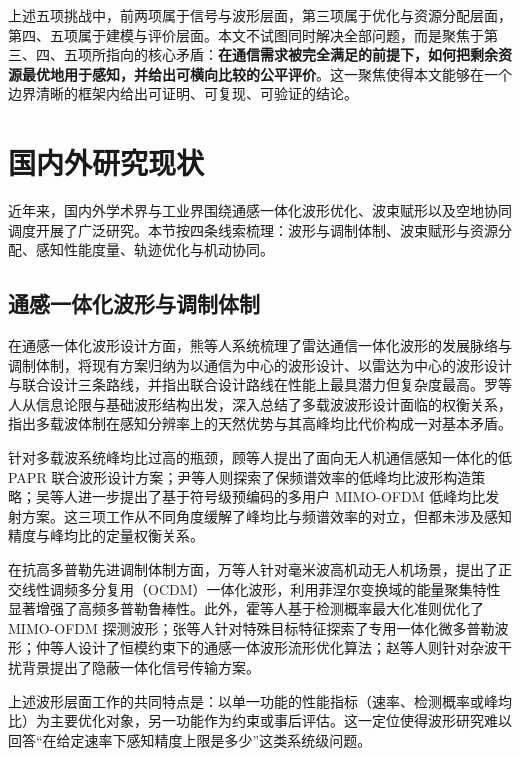 上述五项挑战中，前两项属于信号与波形层面，第三项属于优化与资源分配层面，第四、五项属于建模与评价层面。本文不试图同时解决全部问题，而是聚焦于第三、四、五项所指向的核心矛盾：\textbf{在通信需求被完全满足的前提下，如何把剩余资源最优地用于感知，并给出可横向比较的公平评价}。这一聚焦使得本文能够在一个边界清晰的框架内给出可证明、可复现、可验证的结论。

\section{国内外研究现状}
\label{sec:related}

近年来，国内外学术界与工业界围绕通感一体化波形优化、波束赋形以及空地协同调度开展了广泛研究。本节按四条线索梳理：波形与调制体制、波束赋形与资源分配、感知性能度量、轨迹优化与机动协同。

\subsection{通感一体化波形与调制体制}
在通感一体化波形设计方面，熊等人系统梳理了雷达通信一体化波形的发展脉络与调制体制\cite{xiong2022overview}，将现有方案归纳为以通信为中心的波形设计、以雷达为中心的波形设计与联合设计三条路线，并指出联合设计路线在性能上最具潜力但复杂度最高。罗等人从信息论限与基础波形结构出发，深入总结了多载波波形设计面临的权衡关系\cite{luo2024integrated}，指出多载波体制在感知分辨率上的天然优势与其高峰均比代价构成一对基本矛盾。

针对多载波系统峰均比过高的瓶颈，顾等人提出了面向无人机通信感知一体化的低 PAPR 联合波形设计方案\cite{gu2024papr}；尹等人则探索了保频谱效率的低峰均比波形构造策略\cite{yin2026papr}；吴等人进一步提出了基于符号级预编码的多用户 MIMO-OFDM 低峰均比发射方案\cite{wu2025symbol}。这三项工作从不同角度缓解了峰均比与频谱效率的对立，但都未涉及感知精度与峰均比的定量权衡关系。

在抗高多普勒先进调制体制方面，万等人针对毫米波高机动无人机场景，提出了正交线性调频多分复用（OCDM）一体化波形，利用菲涅尔变换域的能量聚集特性显著增强了高频多普勒鲁棒性\cite{wan2024orthogonal}。此外，霍等人基于检测概率最大化准则优化了 MIMO-OFDM 探测波形\cite{huo2024waveform}；张等人针对特殊目标特征探索了专用一体化微多普勒波形\cite{zhang2025waveform}；仲等人设计了恒模约束下的通感一体波形流形优化算法\cite{zhong2022constant}；赵等人则针对杂波干扰背景提出了隐蔽一体化信号传输方案\cite{zhao2025covert}。

上述波形层面工作的共同特点是：以单一功能的性能指标（速率、检测概率或峰均比）为主要优化对象，另一功能作为约束或事后评估。这一定位使得波形研究难以回答“在给定速率下感知精度上限是多少”这类系统级问题。

